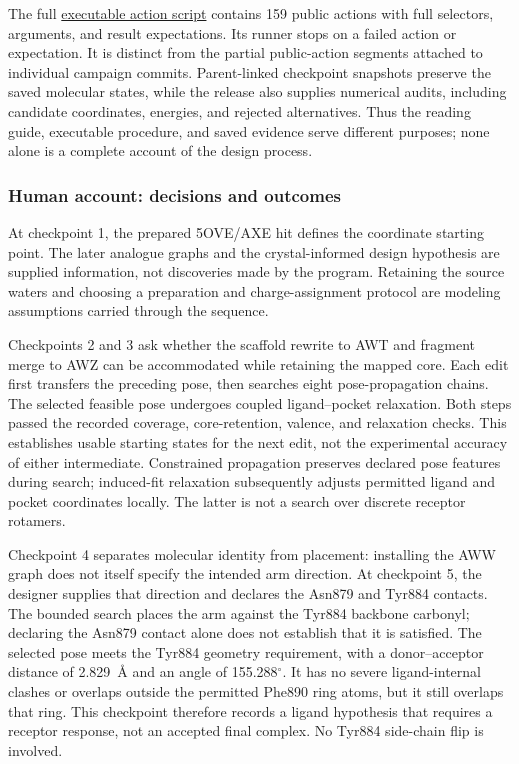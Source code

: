\documentclass[11pt]{article}
\begin{document}
\begin{small}
\endgroup

The full \href{https://molarium.org/design-history/publications/sos1/designer-intent-2026-09-04/executable.action-script.json}{executable action script} contains 159 public actions with full selectors, arguments, and result expectations. Its runner stops on a failed action or expectation. It is distinct from the partial public-action segments attached to individual campaign commits. Parent-linked checkpoint snapshots preserve the saved molecular states, while the release also supplies numerical audits, including candidate coordinates, energies, and rejected alternatives. Thus the reading guide, executable procedure, and saved evidence serve different purposes; none alone is a complete account of the design process.

\subsubsection{Human account: decisions and outcomes}

At checkpoint 1, the prepared 5OVE/AXE hit defines the coordinate starting point. The later analogue graphs and the crystal-informed design hypothesis are supplied information, not discoveries made by the program. Retaining the source waters and choosing a preparation and charge-assignment protocol are modeling assumptions carried through the sequence.

Checkpoints 2 and 3 ask whether the scaffold rewrite to AWT and fragment merge to AWZ can be accommodated while retaining the mapped core. Each edit first transfers the preceding pose, then searches eight pose-propagation chains. The selected feasible pose undergoes coupled ligand--pocket relaxation. Both steps passed the recorded coverage, core-retention, valence, and relaxation checks. This establishes usable starting states for the next edit, not the experimental accuracy of either intermediate. Constrained propagation preserves declared pose features during search; induced-fit relaxation subsequently adjusts permitted ligand and pocket coordinates locally. The latter is not a search over discrete receptor rotamers.

Checkpoint 4 separates molecular identity from placement: installing the AWW graph does not itself specify the intended arm direction. At checkpoint 5, the designer supplies that direction and declares the Asn879 and Tyr884 contacts. The bounded search places the arm against the Tyr884 backbone carbonyl; declaring the Asn879 contact alone does not establish that it is satisfied. The selected pose meets the Tyr884 geometry requirement, with a donor--acceptor distance of 2.829~\AA{} and an angle of 155.288$^{\circ}$. It has no severe ligand-internal clashes or overlaps outside the permitted Phe890 ring atoms, but it still overlaps that ring. This checkpoint therefore records a ligand hypothesis that requires a receptor response, not an accepted final complex. No Tyr884 side-chain flip is involved.


\end{small}
\end{document}
